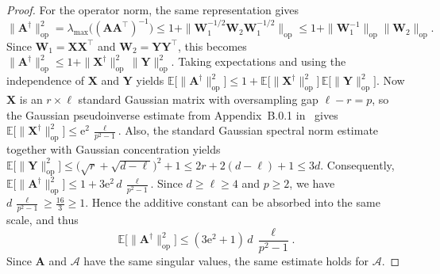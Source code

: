 \documentclass[final,onefignum,onetabnum]{siamart250211}
\begin{document}
\begin{proof}
  For the operator norm, the same representation gives
  \[
  \|\mathbf{A}^{\dagger}\|_{\mathrm{op}}^{2}
  =
  \lambda_{\max}\!\big((\mathbf{A}\mathbf{A}^\top)^{-1}\big)
  \le
  1+\|\mathbf{W}_1^{-1/2}\mathbf{W}_2\mathbf{W}_1^{-1/2}\|_{\mathrm{op}}
  \le
  1+\|\mathbf{W}_1^{-1}\|_{\mathrm{op}}\|\mathbf{W}_2\|_{\mathrm{op}}.
  \]
  Since $\mathbf{W}_1=\mathbf{X}\mathbf{X}^\top$ and $\mathbf{W}_2=\mathbf{Y}\mathbf{Y}^\top$, this becomes
  $
  \|\mathbf{A}^{\dagger}\|_{\mathrm{op}}^{2}
  \le
  1+\|\mathbf{X}^{\dagger}\|_{\mathrm{op}}^{2}\,\|\mathbf{Y}\|_{\mathrm{op}}^{2}.
  $
  Taking expectations and using the independence of $\mathbf{X}$ and $\mathbf{Y}$ yields
  $
  \mathbb E\big[\|\mathbf{A}^{\dagger}\|_{\mathrm{op}}^{2}\big]
  \le
  1+\mathbb E\big[\|\mathbf{X}^{\dagger}\|_{\mathrm{op}}^{2}\big]\,
  \mathbb E\big[\|\mathbf{Y}\|_{\mathrm{op}}^{2}\big].
  $
  Now $\mathbf{X}$ is an $r\times \ell$ standard Gaussian matrix with oversampling gap $\ell-r=p$, so the Gaussian pseudoinverse estimate from Appendix~B.0.1 in~\cite{Frangella2023} gives
  $
  \mathbb E\big[\|\mathbf{X}^{\dagger}\|_{\mathrm{op}}^{2}\big]
  \le
  \mathrm e^{2}\,\frac{\ell}{p^{2}-1}.
  $
  Also, the standard Gaussian spectral norm estimate together with Gaussian concentration yields
  $
  \mathbb E\big[\|\mathbf{Y}\|_{\mathrm{op}}^{2}\big]
  \le
  \bigl(\sqrt r+\sqrt{d-\ell}\bigr)^{2}+1
  \le
  2r+2(d-\ell)+1
  \le
  3d.
  $
  Consequently,
  $
  \mathbb E\big[\|\mathbf{A}^{\dagger}\|_{\mathrm{op}}^{2}\big]
  \le
  1+3\mathrm e^{2}\,d\,\frac{\ell}{p^{2}-1}.
  $
  Since $d\ge \ell\ge 4$ and $p\ge 2$, we have
  $
  d\,\frac{\ell}{p^{2}-1}\ge \frac{16}{3}\ge 1.
  $
  Hence the additive constant can be absorbed into the same scale, and thus
  \[
  \mathbb E\big[\|\mathbf{A}^{\dagger}\|_{\mathrm{op}}^{2}\big]
  \le
  (3\mathrm e^{2}+1)\,d\,\frac{\ell}{p^{2}-1}.
  \]
  Since $\mathbf{A}$ and $\mathcal A$ have the same singular values, the same estimate holds for $\mathcal A$.
\end{proof}
\end{document}
